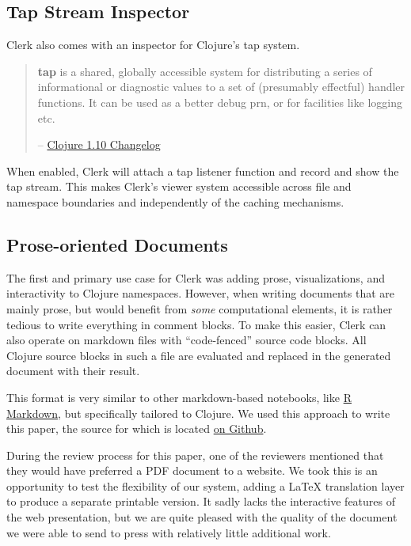 \documentclass[sigconf,screen]{acmart}
\begin{document}
\hypertarget{id}{%
\subsection{Tap Stream Inspector}\label{id}}

Clerk also comes with an inspector for Clojure's tap system.

\begin{quote}
\textbf{tap} is a shared, globally accessible system for distributing a series of informational or diagnostic values to a set of (presumably effectful) handler functions. It can be used as a better debug prn, or for facilities like logging etc.

-- \href{https://github.com/clojure/clojure/blob/0b42eab4bfca5270e0d2b2e58d83b1e2c8a85473/changes.md\#23-tap}{Clojure 1.10 Changelog}
\end{quote}

When enabled, Clerk will attach a tap listener function and record and show the tap stream. This makes Clerk's viewer system accessible across file and namespace boundaries and independently of the caching mechanisms.

\hypertarget{id}{%
\subsection{Prose-oriented Documents}\label{id}}

The first and primary use case for Clerk was adding prose, visualizations, and interactivity to Clojure namespaces. However, when writing documents that are mainly prose, but would benefit from \emph{some} computational elements, it is rather tedious to write everything in comment blocks. To make this easier, Clerk can also operate on markdown files with ``code-fenced'' source code blocks. All Clojure source blocks in such a file are evaluated and replaced in the generated document with their result.

This format is very similar to other markdown-based notebooks, like \href{https://rmarkdown.rstudio.com}{R Markdown}, but specifically tailored to Clojure. We used this approach to write this paper, the source for which is located \href{https://github.com/mk/clerk-px23}{on Github}.

During the review process for this paper, one of the reviewers mentioned that they would have preferred a PDF document to a website. We took this is an opportunity to test the flexibility of our system, adding a LaTeX translation layer to produce a separate printable version. It sadly lacks the interactive features of the web presentation, but we are quite pleased with the quality of the document we were able to send to press with relatively little additional work.
\end{document}
